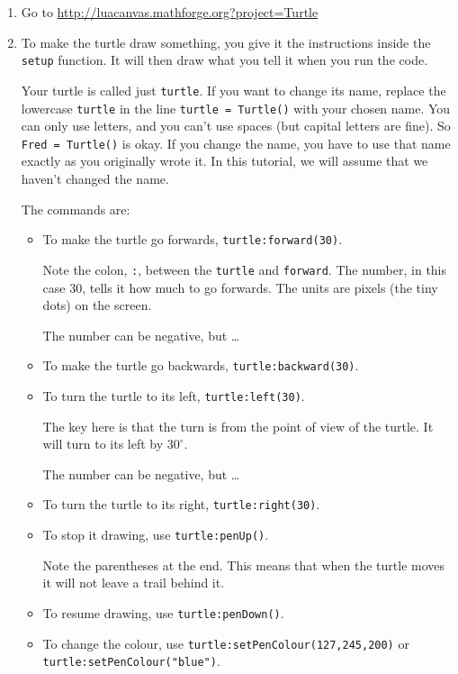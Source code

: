 \documentclass[
  xhtml,%
  use filename%
]{internet}
\begin{document}
\begin{enumerate}
\item Go to \href{http://luacanvas.mathforge.org?project=Turtle}{http://luacanvas.mathforge.org?project=Turtle}
\item To make the turtle draw something, you give it the instructions inside the \verb+setup+ function.
It will then draw what you tell it when you run the code.

Your turtle is called just \verb+turtle+.
If you want to change its name, replace the lowercase \verb+turtle+ in the line \verb+turtle = Turtle()+ with your chosen name.
You can only use letters, and you can't use spaces (but capital letters are fine).
So \verb+Fred = Turtle()+ is okay.
If you change the name, you have to use that name exactly as you originally wrote it.
In this tutorial, we will assume that we haven't changed the name.

The commands are:
\begin{itemize}
\item To make the turtle go forwards, \verb+turtle:forward(30)+.

Note the colon, \verb+:+, between the \verb+turtle+ and \verb+forward+.
The number, in this case \(30\), tells it how much to go forwards.
The units are pixels (the tiny dots) on the screen.

The number can be negative, but \dots

\item To make the turtle go backwards, \verb+turtle:backward(30)+.

\item To turn the turtle to its left, \verb+turtle:left(30)+.

The key here is that the turn is from the point of view of the turtle.
It will turn to its left by \(30^\circ\).

The number can be negative, but \dots

\item To turn the turtle to its right, \verb+turtle:right(30)+.

\item To stop it drawing, use \verb+turtle:penUp()+.

Note the parentheses at the end.
This means that when the turtle moves it will not leave a trail behind it.

\item To resume drawing, use \verb+turtle:penDown()+.

\item To change the colour, use \verb+turtle:setPenColour(127,245,200)+ or \verb+turtle:setPenColour("blue")+.


\end{itemize}
\end{enumerate}
\end{document}
